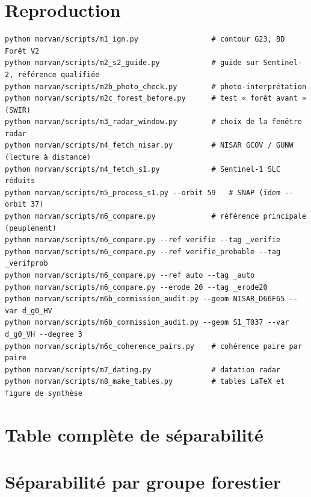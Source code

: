 \documentclass[11pt,a4paper]{article}
\begin{document}


\printbibliography[heading=bibintoc,title={Références}]

\appendix
\section{Reproduction}
\begin{verbatim}
python morvan/scripts/m1_ign.py                 # contour G23, BD Forêt V2
python morvan/scripts/m2_s2_guide.py            # guide sur Sentinel-2, référence qualifiée
python morvan/scripts/m2b_photo_check.py        # photo-interprétation
python morvan/scripts/m2c_forest_before.py      # test « forêt avant » (SWIR)
python morvan/scripts/m3_radar_window.py        # choix de la fenêtre radar
python morvan/scripts/m4_fetch_nisar.py         # NISAR GCOV / GUNW (lecture à distance)
python morvan/scripts/m4_fetch_s1.py            # Sentinel-1 SLC réduits
python morvan/scripts/m5_process_s1.py --orbit 59   # SNAP (idem --orbit 37)
python morvan/scripts/m6_compare.py             # référence principale (peuplement)
python morvan/scripts/m6_compare.py --ref verifie --tag _verifie
python morvan/scripts/m6_compare.py --ref verifie_probable --tag _verifprob
python morvan/scripts/m6_compare.py --ref auto --tag _auto
python morvan/scripts/m6_compare.py --erode 20 --tag _erode20
python morvan/scripts/m6b_commission_audit.py --geom NISAR_D66F65 --var d_g0_HV
python morvan/scripts/m6b_commission_audit.py --geom S1_T037 --var d_g0_VH --degree 3
python morvan/scripts/m6c_coherence_pairs.py    # cohérence paire par paire
python morvan/scripts/m7_dating.py              # datation radar
python morvan/scripts/m8_make_tables.py         # tables LaTeX et figure de synthèse
\end{verbatim}

\section{Table complète de séparabilité}
\begin{table}[H]
\centering\scriptsize
\caption{Toutes les variables, référence principale (moyennes coupe / forêt, d de Cohen, AUC et IC 95~\%, distance de
Jeffries-Matusita).}

\end{table}

\section{Séparabilité par groupe forestier}
\begin{table}[H]
\centering\small
\caption{AUC de $\Delta\gamma^0$ croisée par groupe forestier, référence automatique (60 objets). Les valeurs proches de
0,5 en feuillus traduisent surtout les erreurs de la référence (sénescence).}

\end{table}
\end{document}
